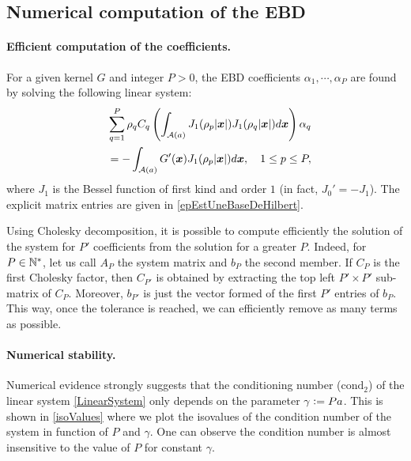 \documentclass[smallextended]{svjour3}
\begin{document}
																					
\subsection{Numerical computation of the EBD}
\label{sub:NumStab}
						
\paragraph{Efficient computation of the coefficients.}					
For a given kernel $G$ and integer $P >0$, the EBD coefficients $\alpha_1,\cdots,\alpha_P$ are found by solving the following linear system: 
\begin{equation}
	\begin{split}
		\sum_{q = 1}^P \rho_q C_q\left(\int_{\mathcal{A}(a)} J_1(\rho_p|\boldsymbol{x}|)  J_1(\rho_q|\boldsymbol{x}|) d\boldsymbol{x}\right) \alpha_q \\
		\quad = -\int_{\mathcal{A}(a)} G'(\boldsymbol{x}) J_1(\rho_p|\boldsymbol{x}|)d\boldsymbol{x}, \quad 1\leq p \leq P,
	\end{split}	
	\label{LinearSystem}
\end{equation}
where $J_1$ is the Bessel function of first kind and order $1$ (in fact, $J_0' = - J_1$). The explicit matrix entries are given in \autoref{epEstUneBaseDeHilbert}. 

Using Cholesky decomposition, it is possible to compute efficiently the solution of the system for $P'$ coefficients from the solution for a greater $P$. Indeed, for $P \in \mathbb{N}^*$, let us call $A_P$ the system matrix and $b_P$ the second member. If $C_P$ is the first Cholesky factor, then $C_{P'}$ is obtained by extracting the top left $P'\times P'$ sub-matrix of $C_P$. Moreover, $b_{P'}$ is just the vector formed of the first $P'$ entries of $b_P$. This way, once the tolerance is reached, we can efficiently remove as many terms as possible. 
\newcommand{\Pa}{\gamma}

\paragraph{Numerical stability.}	

Numerical evidence strongly suggests that the conditioning number ($\text{cond}_2$) of the linear system \eqref{LinearSystem} only depends on the parameter $\Pa \isdef Pa$. This is shown in \autoref{isoValues} where we plot the isovalues of the condition number of the system in function of $P$ and $\gamma$. One can observe the condition number is almost insensitive to the value of $P$ for constant $\gamma$. 
\end{document}
